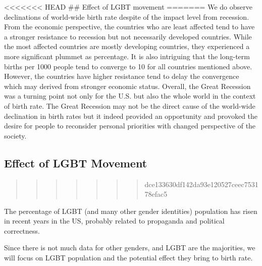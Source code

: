 \documentclass[
]{article}
\begin{document}
\textless\textless\textless\textless\textless\textless\textless{} HEAD
\#\# Effect of LGBT movement
=======
We do observe declinations of world-wide birth rate despite of the impact level from recession. From the economic perspective, the countries who are least affected tend to have a stronger resistance to recession but not necessarily developed countries. While the most affected countries are mostly developing countries, they experienced a more significant plummet as percentage. It is also intriguing that the long-term births per 1000 people tend to converge to 10 for all countries mentioned above. However, the countries have higher resistance tend to delay the convergence which may derived from stronger economic status. Overall, the Great Recession was a turning point not only for the U.S. but also the whole world in the context of birth rate. The Great Recession may not be the direct cause of the world-wide declination in birth rates but it indeed provided an opportunity and provoked the desire for people to reconsider personal priorities with changed perspective of the society.

\hypertarget{effect-of-lgbt-movement}{%
\subsection{Effect of LGBT Movement}\label{effect-of-lgbt-movement}}

\begin{quote}
\begin{quote}
\begin{quote}
\begin{quote}
\begin{quote}
\begin{quote}
\begin{quote}
dce133630df142da93e120527ceec753178efac5
\end{quote}
\end{quote}
\end{quote}
\end{quote}
\end{quote}
\end{quote}
\end{quote}

The percentage of LGBT (and many other gender identities) population has risen in recent years in the US, probably related to propaganda and political correctness.

Since there is not much data for other genders, and LGBT are the majorities, we will focus on LGBT population and the potential effect they bring to birth rate.
\end{document}
